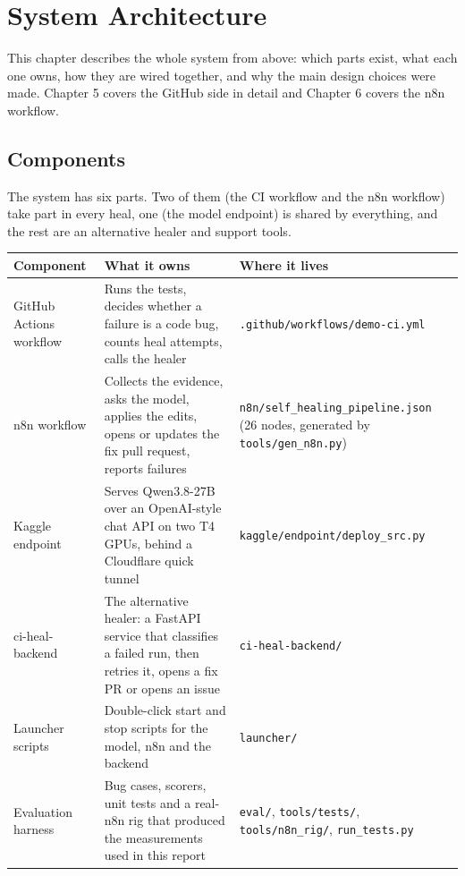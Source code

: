 \documentclass[11pt,a4paper]{report}
\begin{document}
\chapter{System Architecture}

This chapter describes the whole system from above: which parts exist, what each one owns, how they are wired together, and why the main design choices were made. Chapter 5 covers the GitHub side in detail and Chapter 6 covers the n8n workflow.

\section{Components}

The system has six parts. Two of them (the CI workflow and the n8n workflow) take part in every heal, one (the model endpoint) is shared by everything, and the rest are an alternative healer and support tools.

\begin{longtable}{>{\raggedright\arraybackslash}p{0.161\dimexpr\linewidth-6\tabcolsep\relax}>{\raggedright\arraybackslash}p{0.420\dimexpr\linewidth-6\tabcolsep\relax}>{\raggedright\arraybackslash}p{0.420\dimexpr\linewidth-6\tabcolsep\relax}}
\toprule
\textbf{Component} & \textbf{What it owns} & \textbf{Where it lives} \\
\midrule
\endhead
GitHub Actions workflow & Runs the tests, decides whether a failure is a code bug, counts heal attempts, calls the healer & \texttt{.\allowbreak{}github/\allowbreak{}workflows/\allowbreak{}demo-\allowbreak{}ci.\allowbreak{}yml} \\
n8n workflow & Collects the evidence, asks the model, applies the edits, opens or updates the fix pull request, reports failures & \texttt{n8n/\allowbreak{}self\_\allowbreak{}healing\_\allowbreak{}pipeline.\allowbreak{}json} (26 nodes, generated by \texttt{tools/\allowbreak{}gen\_\allowbreak{}n8n.\allowbreak{}py}) \\
Kaggle endpoint & Serves Qwen3.8-27B over an OpenAI-style chat API on two T4 GPUs, behind a Cloudflare quick tunnel & \texttt{kaggle/\allowbreak{}endpoint/\allowbreak{}deploy\_\allowbreak{}src.\allowbreak{}py} \\
ci-heal-backend & The alternative healer: a FastAPI service that classifies a failed run, then retries it, opens a fix PR or opens an issue & \texttt{ci-\allowbreak{}heal-\allowbreak{}backend/\allowbreak{}} \\
Launcher scripts & Double-click start and stop scripts for the model, n8n and the backend & \texttt{launcher/\allowbreak{}} \\
Evaluation harness & Bug cases, scorers, unit tests and a real-n8n rig that produced the measurements used in this report & \texttt{eval/\allowbreak{}}, \texttt{tools/\allowbreak{}tests/\allowbreak{}}, \texttt{tools/\allowbreak{}n8n\_\allowbreak{}rig/\allowbreak{}}, \texttt{run\_\allowbreak{}tests.\allowbreak{}py} \\
\bottomrule
\end{longtable}
\end{document}
